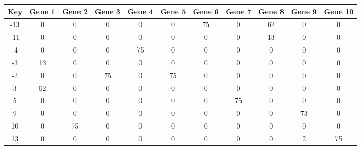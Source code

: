 \begin{tabular}{|c|c|c|c|c|c|c|c|c|c|c|}
\hline
Key & Gene 1 & Gene 2 & Gene 3 & Gene 4 & Gene 5 & Gene 6 & Gene 7 & Gene 8 & Gene 9 & Gene 10 \\
\hline
-13 & 0 & 0 & 0 & 0 & 0 & 75 & 0 & 62 & 0 & 0 \\
-11 & 0 & 0 & 0 & 0 & 0 & 0 & 0 & 13 & 0 & 0 \\
-4 & 0 & 0 & 0 & 75 & 0 & 0 & 0 & 0 & 0 & 0 \\
-3 & 13 & 0 & 0 & 0 & 0 & 0 & 0 & 0 & 0 & 0 \\
-2 & 0 & 0 & 75 & 0 & 75 & 0 & 0 & 0 & 0 & 0 \\
3 & 62 & 0 & 0 & 0 & 0 & 0 & 0 & 0 & 0 & 0 \\
5 & 0 & 0 & 0 & 0 & 0 & 0 & 75 & 0 & 0 & 0 \\
9 & 0 & 0 & 0 & 0 & 0 & 0 & 0 & 0 & 73 & 0 \\
10 & 0 & 75 & 0 & 0 & 0 & 0 & 0 & 0 & 0 & 0 \\
13 & 0 & 0 & 0 & 0 & 0 & 0 & 0 & 0 & 2 & 75 \\
\hline
\end{tabular}